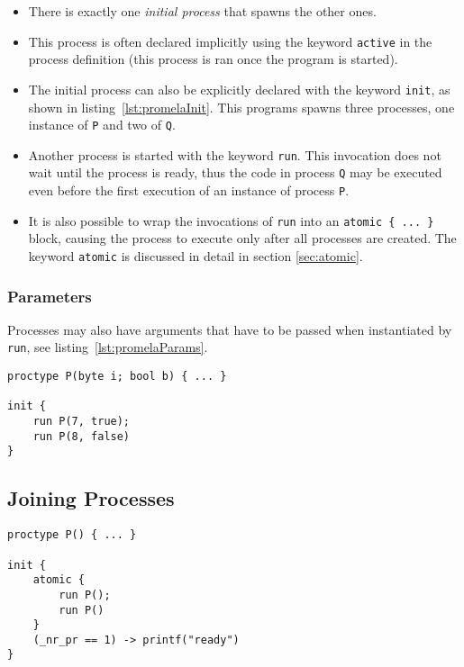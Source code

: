 \documentclass[a4paper, 11pt, accentcolor = tud3b]{tudreport}
\newcommand{\inlinePromela}[1]{\lstinline[language = PROMELA]|#1|}
\begin{document}
				\begin{itemize}
					\item There is exactly one \textit{initial process} that spawns the other ones.
					\item This process is often declared implicitly using the keyword \inlinePromela{active} in the process definition (this process is ran once the program is started).
					\item The initial process can also be explicitly declared with the keyword \inlinePromela{init}, as shown in listing~\ref{lst:promelaInit}. This programs spawns three processes, one instance of \inlinePromela{P} and two of \inlinePromela{Q}.
					\item Another process is started with the keyword \inlinePromela{run}. This invocation does not wait until the process is ready, thus the code in process \inlinePromela{Q} may be executed even before the first execution of an instance of process \inlinePromela{P}.
					\item It is also possible to wrap the invocations of \inlinePromela{run} into an \inlinePromela{atomic { ... }} block, causing the process to execute only after all processes are created. The keyword \inlinePromela{atomic} is discussed in detail in section \ref{sec:atomic}.
				\end{itemize}
			
				\subsubsection{Parameters}
					Processes may also have arguments that have to be passed when instantiated by \inlinePromela{run}, see listing~\ref{lst:promelaParams}.
					
					\begin{lstlisting}[caption = { PROMELA Processes with Parameters }, label = lst:promelaParams, language = PROMELA]
proctype P(byte i; bool b) { ... }

init {
	run P(7, true);
	run P(8, false)
}
					\end{lstlisting}

			\subsection{Joining Processes}
				\begin{lstlisting}[caption = { Joining PROMELA Processes }, label = lst:promelaJoin, language = PROMELA]
proctype P() { ... }

init {
	atomic {
		run P();
		run P()
	}
	(_nr_pr == 1) -> printf("ready")
}
				\end{lstlisting}
			
\end{document}
